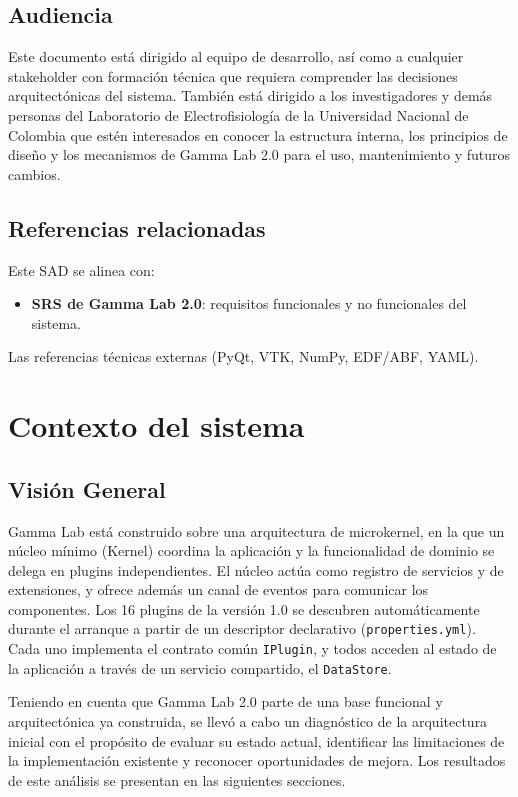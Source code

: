 \documentclass[11pt,a4paper]{article}
\DeclareRobustCommand{\_}{\textunderscore\allowbreak}
\begin{document}
\subsection{Audiencia}
Este documento está dirigido al equipo de desarrollo, así como a cualquier stakeholder con formación técnica que requiera comprender las decisiones arquitectónicas del sistema. También está dirigido a los investigadores y demás personas del Laboratorio de Electrofisiología de la Universidad Nacional de Colombia que estén interesados en conocer la estructura interna, los principios de diseño y los mecanismos de Gamma Lab 2.0 para el uso, mantenimiento y futuros cambios.

\subsection{Referencias relacionadas}
Este SAD se alinea con:
\begin{itemize}[nosep]
    \item \textbf{SRS de Gamma Lab 2.0}: requisitos funcionales y no funcionales del sistema.
\end{itemize}

Las referencias t\'ecnicas externas (PyQt, VTK, NumPy, EDF/ABF, YAML).

\section{Contexto del sistema}

\subsection{Visión General}

Gamma Lab está construido sobre una arquitectura de microkernel, en la que un núcleo mínimo (Kernel) coordina la aplicación y la funcionalidad de dominio se delega en plugins independientes. El núcleo actúa como registro de servicios y de extensiones, y ofrece además un canal de eventos para comunicar los componentes. Los 16 plugins de la versión 1.0 se descubren automáticamente durante el arranque a partir de un descriptor declarativo (\texttt{properties.yml}). Cada uno implementa el contrato común \texttt{IPlugin}, y todos acceden al estado de la aplicación a través de un servicio compartido, el \texttt{DataStore}.


Teniendo en cuenta que Gamma Lab 2.0 parte de una base funcional y arquitectónica ya construida, se llevó a cabo un diagnóstico de la arquitectura inicial con el propósito de evaluar su estado actual, identificar las limitaciones de la implementación existente y reconocer oportunidades de mejora. Los resultados de este análisis se presentan en las siguientes secciones.
\end{document}

